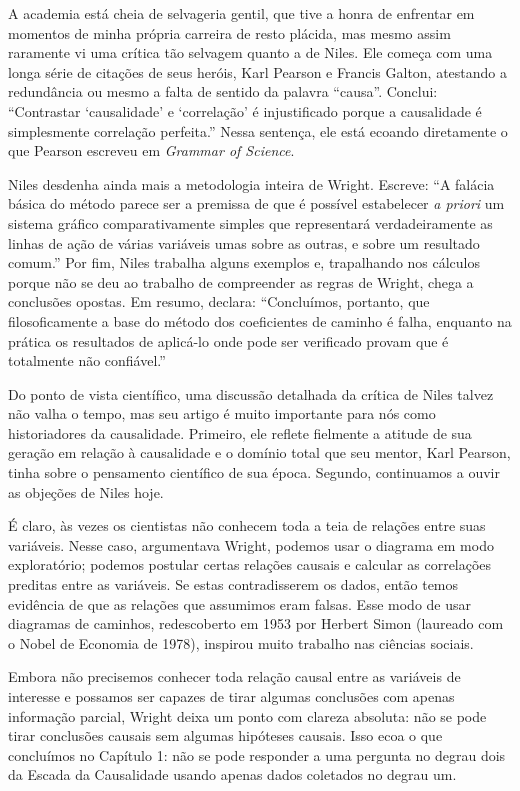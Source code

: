 \documentclass[11pt,a5paper,twoside]{book}
\begin{document}
A academia está cheia de selvageria gentil, que tive a honra de enfrentar em momentos de minha própria carreira de resto plácida, mas mesmo assim raramente vi uma crítica tão selvagem quanto a de Niles. Ele começa com uma longa série de citações de seus heróis, Karl Pearson e Francis Galton, atestando a redundância ou mesmo a falta de sentido da palavra “causa”. Conclui: “Contrastar ‘causalidade’ e ‘correlação’ é injustificado porque a causalidade é simplesmente correlação perfeita.” Nessa sentença, ele está ecoando diretamente o que Pearson escreveu em \textit{Grammar of Science}.

Niles desdenha ainda mais a metodologia inteira de Wright. Escreve: “A falácia básica do método parece ser a premissa de que é possível estabelecer \textit{a priori} um sistema gráfico comparativamente simples que representará verdadeiramente as linhas de ação de várias variáveis umas sobre as outras, e sobre um resultado comum.” Por fim, Niles trabalha alguns exemplos e, trapalhando nos cálculos porque não se deu ao trabalho de compreender as regras de Wright, chega a conclusões opostas. Em resumo, declara: “Concluímos, portanto, que filosoficamente a base do método dos coeficientes de caminho é falha, enquanto na prática os resultados de aplicá-lo onde pode ser verificado provam que é totalmente não confiável.”

Do ponto de vista científico, uma discussão detalhada da crítica de Niles talvez não valha o tempo, mas seu artigo é muito importante para nós como historiadores da causalidade. Primeiro, ele reflete fielmente a atitude de sua geração em relação à causalidade e o domínio total que seu mentor, Karl Pearson, tinha sobre o pensamento científico de sua época. Segundo, continuamos a ouvir as objeções de Niles hoje.

É claro, às vezes os cientistas não conhecem toda a teia de relações entre suas variáveis. Nesse caso, argumentava Wright, podemos usar o diagrama em modo exploratório; podemos postular certas relações causais e calcular as correlações preditas entre as variáveis. Se estas contradisserem os dados, então temos evidência de que as relações que assumimos eram falsas. Esse modo de usar diagramas de caminhos, redescoberto em 1953 por Herbert Simon (laureado com o Nobel de Economia de 1978), inspirou muito trabalho nas ciências sociais.

Embora não precisemos conhecer toda relação causal entre as variáveis de interesse e possamos ser capazes de tirar algumas conclusões com apenas informação parcial, Wright deixa um ponto com clareza absoluta: não se pode tirar conclusões causais sem algumas hipóteses causais. Isso ecoa o que concluímos no Capítulo 1: não se pode responder a uma pergunta no degrau dois da Escada da Causalidade usando apenas dados coletados no degrau um.
\end{document}
